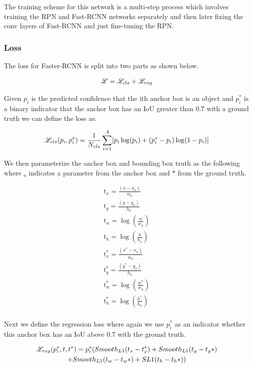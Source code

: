 The training scheme for this network is a multi-step process which involves training the RPN and Fast-RCNN networks separately and then later fixing the conv layers of Fast-RCNN and just fine-tuning the RPN.

\subsubsection{Loss}
The loss for Faster-RCNN is split into two parts as shown below.

\begin{align}
    \mathscr{L} = \mathscr{L}_{cls} +\mathscr{L}_{reg}
\end{align}

Given $p_i$ is the predicted confidence that the ith anchor box is an object and $p_i^*$ is a binary indicator that the anchor box has an IoU greater than 0.7 with a ground truth we can define the loss as:

\begin{align}
    \mathscr{L}_{cls}(p_i,p_i^*) = \frac{1}{N_{cls}} \sum_{i=1}^{A} [p_i\log(p_i) + (p_i^*-p_i)\log(1-p_i)]
\end{align}

We then parameterize the anchor box and bounding box truth as the following where $_a$ indicates a parameter from the anchor box and $*$ from the ground truth.

\begin{align}
    t_x = \frac{(x - x_a)}{w_a} \\
    t_y = \frac{(y - y_a)}{h_a} \\
    t_w = \log(\frac{w}{w_a}) \\
    t_h = \log(\frac{h}{h_a}) \\
    t_x^* = \frac{(x^* - x_a)}{w_a} \\
    t_y^* = \frac{(y^* - y_a)}{h_a} \\
    t_w^* = \log(\frac{w^*}{w_a}) \\
    t_h^* = \log(\frac{h^*}{h_a}) \\
\end{align}

Next we define the regression loss where again we use $p_i^*$ as an indicator whether this anchor box has an IoU above 0.7 with the ground truth.

\begin{multline}
    \mathscr{L}_{reg}(p_i^*, t, t^*) = p_i^*(Smooth_{L1}(t_x-t_x^*) + Smooth_{L1}(t_y-t_y*) \\ + Smooth_{L1}(t_w-t_w*) + SL1(t_h-t_h*)) \\
\end{multline}

